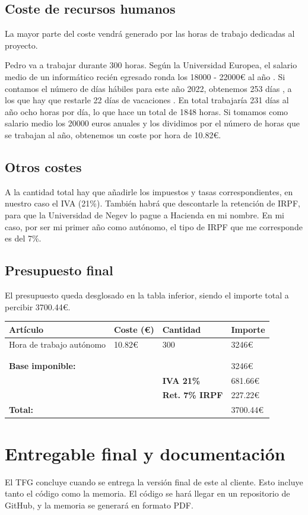 \subsection*{Coste de recursos humanos}
La mayor parte del coste vendrá generado por las horas de trabajo dedicadas al proyecto.

Pedro va a trabajar durante 300 horas. Según la Universidad Europea, el salario medio de un informático recién egresado ronda los 18000 - 22000€ al año \cite{salario_ue}. Si contamos el número de días hábiles para este año 2022, obtenemos 253 días \cite{dias_laborables}, a los que hay que restarle 22 días de vacaciones \cite{vacaciones}. En total trabajaría 231 días al año ocho horas por día, lo que hace un total de 1848 horas. Si tomamos como salario medio los 20000 euros anuales y los dividimos por el número de horas que se trabajan al año, obtenemos un coste por hora de 10.82€.

\subsection*{Otros costes}
A la cantidad total hay que añadirle los impuestos y tasas correspondientes, en nuestro caso el IVA (21\%). También habrá que descontarle la retención de IRPF, para que la Universidad de Negev lo pague a Hacienda en mi nombre. En mi caso, por ser mi primer año como autónomo, el tipo de IRPF que me corresponde es del 7\%.

\subsection*{Presupuesto final}

El presupuesto queda desglosado en la tabla inferior, siendo el importe total a percibir 3700.44€.

\begin{table}[H]
\begin{tabular}{@{}llll@{}}
\toprule
\textbf{Artículo}        & \textbf{Coste (€)} & \textbf{Cantidad}      & \textbf{Importe} \\ \midrule
Hora de trabajo autónomo & 10.82€             & 300                    & 3246€            \\
                            &                    &                        &                  \\
                            &                    &                        &                  \\ \midrule
\textbf{Base imponible:} &                    & \textbf{}              & 3246€            \\
                            &                    & \textbf{IVA 21\%}      & 681.66€          \\
                            &                    & \textbf{Ret. 7\% IRPF} & 227.22€          \\ \midrule
\textbf{Total:}          &                    &                        & 3700.44€        
\end{tabular}
\end{table}

\section*{Entregable final y documentación}
El TFG  concluye cuando se entrega la versión final de este al cliente. Esto incluye tanto el código como la memoria. El código se hará llegar en un repositorio de GitHub, y la memoria se generará en formato PDF.